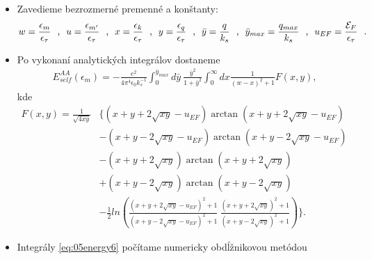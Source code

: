 \documentclass[
	11pt, %
]{beamer}
\begin{document}
\begin{frame}
\begin{itemize}
\item  Zavedieme bezrozmerné premenné a konštanty:
\small
\begin{equation}
w=\frac{\epsilon_m}{\epsilon_\tau} \ \ \text{,} \ \
u=\frac{\epsilon_{m'}}{\epsilon_\tau} \ \ \text{,} \ \
x=\frac{\epsilon_k}{\epsilon_\tau} \ \ \text{,} \ \
y=\frac{\epsilon_q}{\epsilon_\tau} \ \ \text{,} \ \
\bar{y}=\frac{q}{k_s}  \ \   \text{,} \ \
\bar{y}_{max}=\frac{q_{max}}{k_s}  \ \ \text{,} \ \
u_{EF}=\frac{\E_F}{\epsilon_\tau}  \ \ \text{.}
\end{equation}
\normalsize
\item Po vykonaní analytických integrálov dostaneme
\begin{align}
\label{eq:05energy6}
E_{self}^{AA}(\epsilon_m)= -\frac{e^2}{4\pi^4\epsilon_0 k_s^{-1}} \int_0^{\bar y_{max}} d\bar{y}\ \frac{\bar{y}^2}{1+\bar{y}^2}\int_0^{\infty} dx \frac{1}{(w-x)^2+1}F(x,y) \text{,}
\end{align}
kde
\tiny
\begin{align*}
F(x,y)=\frac{1}{\sqrt{4xy}}& \{(x+y+2\sqrt{xy}-u_{EF})\arctan(x+y+2\sqrt{xy}-u_{EF}) \\
&-(x+y-2\sqrt{xy}-u_{EF})\arctan(x+y-2\sqrt{xy}-u_{EF}) \\
&-(x+y+2\sqrt{xy})\arctan(x+y+2\sqrt{xy}) \\
&+(x+y-2\sqrt{xy})\arctan(x+y-2\sqrt{xy}) \\
&-\frac{1}{2}ln(\frac{(x+y+2\sqrt{xy}-u_{EF})^2+1}{(x+y-2\sqrt{xy}-u_{EF})^2+1}\ \frac{(x+y+2\sqrt{xy})^2+1}{(x+y-2\sqrt{xy})^2+1})\}\text{.}
\end{align*}
\normalsize
\item Integrály \eqref{eq:05energy6} počítame numericky obdĺžnikovou metódou
\end{itemize}
\end{frame}
\end{document}
